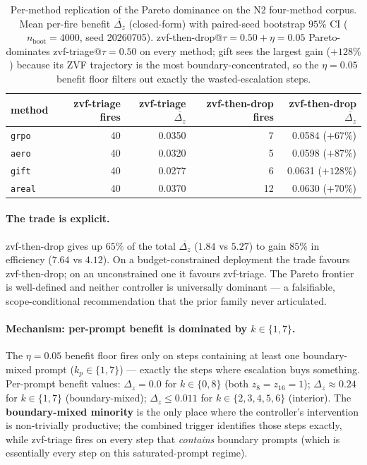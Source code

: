 \documentclass{article}
\begin{document}
\begin{table}[t]
\centering
\caption{Per-method replication of the Pareto dominance on
the N2 four-method corpus. Mean per-fire benefit
$\overline{\Delta_z}$ (closed-form) with paired-seed bootstrap
$95\%$ CI ($n_{\mathrm{boot}}{=}4000$, seed 20260705).
zvf-then-drop@$\tau{=}0.50{+}\eta{=}0.05$ Pareto-dominates
zvf-triage@$\tau{=}0.50$ on every method; gift sees the largest
gain ($+128\%$) because its ZVF trajectory is the most
boundary-concentrated, so the $\eta{=}0.05$ benefit floor filters
out exactly the wasted-escalation steps.}
\label{tab:p7-iter91-permethod}
\begin{tabular}{lrrrr}
\toprule
method & zvf-triage fires & zvf-triage $\overline{\Delta_z}$ & zvf-then-drop fires & zvf-then-drop $\overline{\Delta_z}$ \\
\midrule
\texttt{grpo}  & 40 & 0.0350 & 7  & 0.0584 ($+67\%$) \\
\texttt{aero}  & 40 & 0.0320 & 5  & 0.0598 ($+87\%$) \\
\texttt{gift}  & 40 & 0.0277 & 6  & 0.0631 ($+128\%$) \\
\texttt{areal} & 40 & 0.0370 & 12 & 0.0630 ($+70\%$) \\
\bottomrule
\end{tabular}
\end{table}

\paragraph{The trade is explicit.}
zvf-then-drop gives up $65\%$ of the total $\overline{\Delta_z}$
($1.84$ vs $5.27$) to gain $85\%$ in efficiency ($7.64$ vs $4.12$).
On a budget-constrained deployment the trade favours
zvf-then-drop; on an unconstrained one it favours zvf-triage.
The Pareto frontier is well-defined and neither controller is
universally dominant --- a falsifiable, scope-conditional
recommendation that the prior family never articulated.

\paragraph{Mechanism: per-prompt benefit is dominated by $k{\in}\{1,7\}$.}
The $\eta{=}0.05$ benefit floor fires only on steps containing at
least one boundary-mixed prompt ($k_p \in \{1, 7\}$) --- exactly
the steps where escalation buys something. Per-prompt benefit
values: $\Delta_z = 0.0$ for $k\in\{0,8\}$ (both $z_8 = z_{16} = 1$);
$\Delta_z \approx 0.24$ for $k\in\{1,7\}$ (boundary-mixed);
$\Delta_z \le 0.011$ for $k \in \{2, 3, 4, 5, 6\}$ (interior). The
\textbf{boundary-mixed minority} is the only place where the
controller's intervention is non-trivially productive; the
combined trigger identifies those steps exactly, while zvf-triage
fires on every step that \emph{contains} boundary prompts (which
is essentially every step on this saturated-prompt regime).
\end{document}
